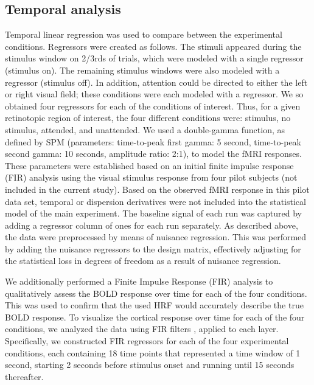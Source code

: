 \documentclass[9pt,lineno]{aperture}
\begin{document}
\subsection{Temporal analysis}
Temporal linear regression was used to compare between the experimental conditions. Regressors were created as follows. The stimuli appeared during the stimulus window on 2/3rds of trials, which were modeled with a single regressor (stimulus on). The remaining stimulus windows were also modeled with a regressor (stimulus off). In addition, attention could be directed to either the left or right visual field; these conditions were each modeled with a regressor. We so obtained four regressors for each of the conditions of interest. Thus, for a given retinotopic region of interest, the four different conditions were: stimulus, no stimulus, attended, and unattended. We used a double-gamma function, as defined by SPM (parameters: time-to-peak first gamma: 5 second, time-to-peak second gamma: 10 seconds, amplitude ratio: 2:1), to model the fMRI responses. These parameters were established based on an initial finite impulse response (FIR) analysis \citep{Friston1998} using the visual stimulus response from four pilot subjects (not included in the current study). Based on the observed fMRI response in this pilot data set, temporal or dispersion derivatives were not included into the statistical model of the main experiment. The baseline signal of each run was captured by adding a regressor column of ones for each run separately. As described above, the data were preprocessed by means of nuisance regression. This was performed by adding the nuisance regressors to the design matrix, effectively adjusting for the statistical loss in degrees of freedom as a result of nuisance regression. 

We additionally performed a Finite Impulse Response (FIR) analysis to qualitatively assess the BOLD response over time for each of the four conditions. This was used to confirm that the used HRF would accurately describe the true BOLD response. To visualize the cortical response over time for each of the four conditions, we analyzed the data using FIR filters \citep{Friston1998}, applied to each layer. Specifically, we constructed FIR regressors for each of the four experimental conditions, each containing 18 time points that represented a time window of 1 second, starting 2 seconds before stimulus onset and running until 15 seconds thereafter. 
\end{document}
